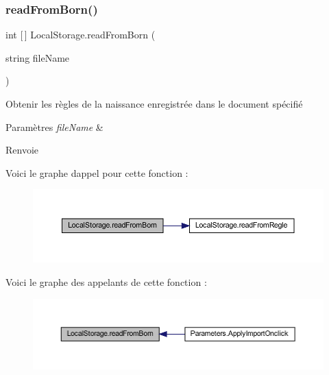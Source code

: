 \subsubsection{\texorpdfstring{read\+From\+Born()}{readFromBorn()}}
{\footnotesize\ttfamily int \mbox{[}$\,$\mbox{]} Local\+Storage.\+read\+From\+Born (\begin{DoxyParamCaption}\item[{string}]{file\+Name }\end{DoxyParamCaption})\hspace{0.3cm}{\ttfamily [inline]}}



Obtenir les règles de la naissance enregistrée dans le document spécifié 


\begin{DoxyParams}{Paramètres}
{\em file\+Name} & \\
\hline
\end{DoxyParams}
\begin{DoxyReturn}{Renvoie}

\end{DoxyReturn}
Voici le graphe d\textquotesingle{}appel pour cette fonction \+:
\nopagebreak
\begin{figure}[H]
\begin{center}
\leavevmode
\includegraphics[width=350pt]{class_local_storage_aa66a98dccf6cb550c5a38c25b9712898_cgraph}
\end{center}
\end{figure}
Voici le graphe des appelants de cette fonction \+:
\nopagebreak
\begin{figure}[H]
\begin{center}
\leavevmode
\includegraphics[width=350pt]{class_local_storage_aa66a98dccf6cb550c5a38c25b9712898_icgraph}
\end{center}
\end{figure}
\mbox{\label{class_local_storage_a200c8f22ceed88238703411e2c0f1e05}} 
